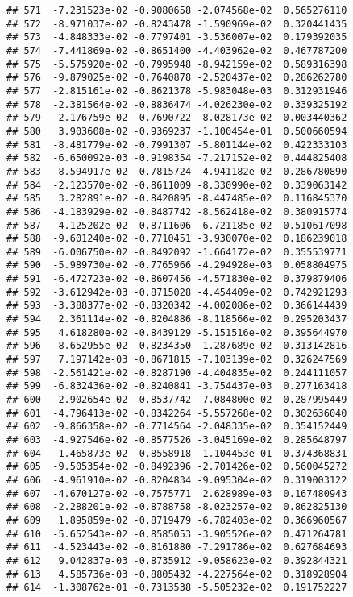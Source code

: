 \documentclass[
]{article}
\begin{document}
\begin{verbatim}
## 571  -7.231523e-02 -0.9080658 -2.074568e-02  0.565276110
## 572  -8.971037e-02 -0.8243478 -1.590969e-02  0.320441435
## 573  -4.848333e-02 -0.7797401 -3.536007e-02  0.179392035
## 574  -7.441869e-02 -0.8651400 -4.403962e-02  0.467787200
## 575  -5.575920e-02 -0.7995948 -8.942159e-02  0.589316398
## 576  -9.879025e-02 -0.7640878 -2.520437e-02  0.286262780
## 577  -2.815161e-02 -0.8621378 -5.983048e-03  0.312931946
## 578  -2.381564e-02 -0.8836474 -4.026230e-02  0.339325192
## 579  -2.176759e-02 -0.7690722 -8.028173e-02 -0.003440362
## 580   3.903608e-02 -0.9369237 -1.100454e-01  0.500660594
## 581  -8.481779e-02 -0.7991307 -5.801144e-02  0.422333103
## 582  -6.650092e-03 -0.9198354 -7.217152e-02  0.444825408
## 583  -8.594917e-02 -0.7815724 -4.941182e-02  0.286780890
## 584  -2.123570e-02 -0.8611009 -8.330990e-02  0.339063142
## 585   3.282891e-02 -0.8420895 -8.447485e-02  0.116845370
## 586  -4.183929e-02 -0.8487742 -8.562418e-02  0.380915774
## 587  -4.125202e-02 -0.8711606 -6.721185e-02  0.510617098
## 588  -9.601240e-02 -0.7710451 -3.930070e-02  0.186239018
## 589  -6.006750e-02 -0.8492092 -1.664172e-02  0.355539771
## 590  -5.989730e-02 -0.7765966 -4.294928e-03  0.058804975
## 591  -6.472723e-02 -0.8607456 -4.571830e-02  0.379879406
## 592  -3.612942e-03 -0.8715028 -4.454409e-02  0.742921293
## 593  -3.388377e-02 -0.8320342 -4.002086e-02  0.366144439
## 594   2.361114e-02 -0.8204886 -8.118566e-02  0.295203437
## 595   4.618280e-02 -0.8439129 -5.151516e-02  0.395644970
## 596  -8.652955e-02 -0.8234350 -1.287689e-02  0.313142816
## 597   7.197142e-03 -0.8671815 -7.103139e-02  0.326247569
## 598  -2.561421e-02 -0.8287190 -4.404835e-02  0.244111057
## 599  -6.832436e-02 -0.8240841 -3.754437e-03  0.277163418
## 600  -2.902654e-02 -0.8537742 -7.084800e-02  0.287995449
## 601  -4.796413e-02 -0.8342264 -5.557268e-02  0.302636040
## 602  -9.866358e-02 -0.7714564 -2.048335e-02  0.354152449
## 603  -4.927546e-02 -0.8577526 -3.045169e-02  0.285648797
## 604  -1.465873e-02 -0.8558918 -1.104453e-01  0.374368831
## 605  -9.505354e-02 -0.8492396 -2.701426e-02  0.560045272
## 606  -4.961910e-02 -0.8204834 -9.095304e-02  0.319003122
## 607  -4.670127e-02 -0.7575771  2.628989e-03  0.167480943
## 608  -2.288201e-02 -0.8788758 -8.023257e-02  0.862825130
## 609   1.895859e-02 -0.8719479 -6.782403e-02  0.366960567
## 610  -5.652543e-02 -0.8585053 -3.905526e-02  0.471264781
## 611  -4.523443e-02 -0.8161880 -7.291786e-02  0.627684693
## 612   9.042837e-03 -0.8735912 -9.058623e-02  0.392844321
## 613   4.585736e-03 -0.8805432 -4.227564e-02  0.318928904
## 614  -1.308762e-01 -0.7313538 -5.505232e-02  0.191752227

\end{verbatim}
\end{document}
